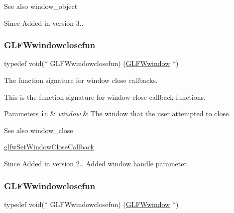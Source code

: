 \begin{DoxySeeAlso}{See also}
window\+\_\+object
\end{DoxySeeAlso}
\begin{DoxySince}{Since}
Added in version 3.. 
\end{DoxySince}
\mbox{\label{group__window_ga93e7c2555bd837f4ed8b20f76cada72e}} 
\subsubsection{\texorpdfstring{G\+L\+F\+Wwindowclosefun}{GLFWwindowclosefun}\hspace{0.1cm}{\footnotesize\ttfamily [1/5]}}
{\footnotesize\ttfamily typedef void($\ast$  G\+L\+F\+Wwindowclosefun) (\hyperlink{group__window_ga3c96d80d363e67d13a41b5d1821f3242}{G\+L\+F\+Wwindow} $\ast$)}



The function signature for window close callbacks. 

This is the function signature for window close callback functions.


\begin{DoxyParams}[1]{Parameters}
\mbox{\tt in}  & {\em window} & The window that the user attempted to close.\\
\hline
\end{DoxyParams}
\begin{DoxySeeAlso}{See also}
window\+\_\+close 

\hyperlink{group__window_ga5b827da350141c789acd64f5c4f7a0e1}{glfw\+Set\+Window\+Close\+Callback}
\end{DoxySeeAlso}
\begin{DoxySince}{Since}
Added in version 2..  Added window handle parameter. 
\end{DoxySince}
\mbox{\label{group__window_ga93e7c2555bd837f4ed8b20f76cada72e}} 
\subsubsection{\texorpdfstring{G\+L\+F\+Wwindowclosefun}{GLFWwindowclosefun}\hspace{0.1cm}{\footnotesize\ttfamily [2/5]}}
{\footnotesize\ttfamily typedef void($\ast$  G\+L\+F\+Wwindowclosefun) (\hyperlink{group__window_ga3c96d80d363e67d13a41b5d1821f3242}{G\+L\+F\+Wwindow} $\ast$)}



